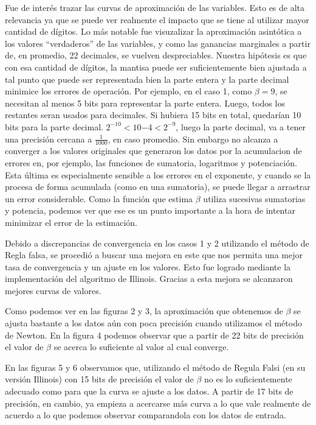 Fue de inter\'es trazar las curvas de aproximaci\'on de las variables. 
Esto es de alta relevancia ya que se puede ver realmente el impacto que se tiene
al utilizar mayor cantidad de d\'igitos. Lo m\'as notable fue visuzalizar la 
aproximaci\'on asint\'otica a los valores ``verdaderos'' de las variables, 
y como las ganancias marginales a partir de, en promedio, 22 decimales, 
se vuelven despreciables. Nuestra hip\'otesis es que con esa cantidad de 
d\'igitos, la mantisa puede ser suficientemente bien ajustada a tal punto que puede 
ser representada bien la parte entera y la parte decimal minimice los errores de 
operaci\'on. Por ejemplo, en el caso 1, como $\beta = 9$, se necesitan al menos 
5 bits para representar la parte entera. Luego, todos los restantes seran usados 
para decimales. Si hubiera 15 bits en total, quedar\'ian 10 bits para la parte 
decimal. $2^{-10}<10{-4}<2^{-9}$, luego la parte decimal, va a tener una
precisi\'on cercana a $\frac{1}{1000}$, en caso promedio. 
Sin embargo no alcanza a converger a los valores originales que generaron los 
datos por la acumulacion de errores en, por ejemplo, las funciones
de sumatoria, logaritmos y potenciaci\'on. Esta \'ultima es especialmente 
sensible a los errores en el exponente, y cuando se la procesa de forma 
acumulada (como en una sumatoria), se puede llegar a arrastrar un error
considerable. Como la funci\'on que estima
$\beta$ utiliza sucesivas sumatorias y potencia, podemos ver que ese es un punto 
importante a la hora de intentar minimizar el error de la estimaci\'on.

Debido a discrepancias de convergencia en los casos 1 y 2 utilizando el m\'etodo
de Regla falsa, se procedi\'o a buscar una mejora en este que nos permita una mejor
tasa de convergencia y un ajuste en los valores. Esto fue logrado mediante la
implementaci\'on del algoritmo de Illinois. Gracias a esta mejora se alcanzaron 
mejores curvas de valores.

Como podemos ver en las figuras 2 y 3, la aproximaci\'on que obtenemos de $\beta$ se ajusta bastante
a los datos a\'un con poca precisi\'on cuando utilizamos el m\'etodo de Newton. En la figura 4 podemos
observar que a partir de 22 bits de precisi\'on el valor de $\beta$ se acerca lo suficiente al valor
al cual converge.

En las figuras 5 y 6 observamos que, utilizando el m\'etodo de Regula Falsi (en su versi\'on Illinois)
con 15 bits de precisi\'on el valor de $\beta$ no es lo suficientemente adecuado como para que la curva
se ajuste a los datos. A partir de 17 bits de precisi\'on, en cambio, ya empieza a acercarse m\'as curva
a lo que vale realmente de acuerdo a lo que podemos observar comparandola con los datos de entrada.

